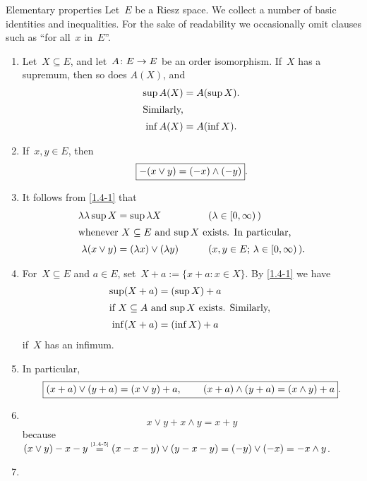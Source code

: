 \documentclass[main.tex]{subfiles}
\begin{document}
\begin{psec}{1.4}{Elementary properties}
Let~$E$ be a Riesz space. 
We collect a number of basic identities and inequalities.
For the sake of readability
we occasionally omit clauses such as ``for all~$x$ in~$E$''.
\begin{enumerate}
\item %
\label{1.4-1}
Let~$X\subseteq E$, and let~$A\colon E\rightarrow E$ 
be an order isomorphism.
If~$X$ has a supremum,
then so does $A(X)$,
and
\begin{align*}
\sup A(X) &= A(\sup X)
\htam{.} \\
\intertext{%
Similarly, %
}
\inf A(X) &= A(\inf X)
\htam{.}
\end{align*}
\item %
\label{1.4-2}
If~$x,y\in E$, then
\begin{equation*}
\fbox{$  -(x\vee y) = (-x)\wedge(-y)  $}
\text{.}
\end{equation*}
\item %
\label{1.4-3}
It follows from \ref{1.4-1} that
\begin{alignat*}
\lambda \lambda \sup X &= \sup \lambda X \qquad &&(\lambda \in [0,\infty)\,) \\
\intertext{%
whenever~$X\subseteq E$ and~$\sup X$ exists.
In particular, }
\lambda (x \vee y) &=  (\lambda x) \vee (\lambda y) 
  \qquad &&(x,y\in E\htam{; }\lambda\in[0,\infty)\,)\htam{.}
\end{alignat*}
\item %
\label{1.4-4}
For~$X\subseteq E$ and $a\in E$,
set~$X+a:=\{x+a\colon x\in X\}$.
By \ref{1.4-1} we have
\begin{align*}
\sup(X+a) &= (\sup X) + a \\
\intertext{%
if $X\subseteq A$ and $\sup X$ exists.
Similarly, }
\inf (X+a) &= (\inf X)+a
\end{align*}
if~$X$ has an infimum.
\item %
\label{1.4-5}
In particular,
\begin{equation*}
\frmd{%
(x+a)\vee   (y+a)=(x\vee y)+a
\htam{, } \qquad 
(x+a)\wedge (y+a)=(x\wedge y)+a }
\htam{.}
\end{equation*}
\item %
\label{1.4-6}  
$ $ %
\begin{equation*}
x\vee y + x\wedge y = x+y
\end{equation*}
because~$(x\vee y)-x-y 
\isref{1.4-5}
(x-x-y)\vee(y-x-y)=(-y)\vee(-x)=-x\wedge y$.
\item %

\end{enumerate}
\end{psec}
\end{document}
